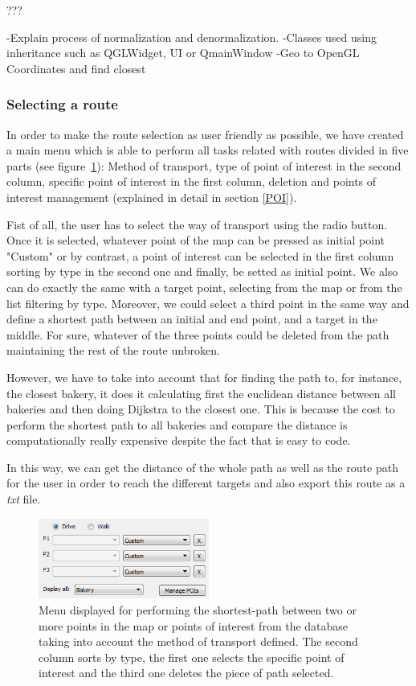 \documentclass{article}
\begin{document}
???



-Explain process of normalization and denormalization.
-Classes used using inheritance such as QGLWidget, UI or QmainWindow
-Geo to OpenGL Coordinates and find closest

\subsubsection{Selecting a route}
In order to make the route selection as user friendly as possible, we have created a main menu which is able to perform all tasks related with routes divided in five parts (see figure~\ref{fig:menu_poi}): Method of transport, type of point of interest in the second column, specific point of interest in the first column, deletion and points of interest management (explained in detail in section \ref{POI}).

Fist of all, the user has to select the way of transport using the radio button. Once it is selected, whatever point of the map can be pressed as initial point "Custom" or by contrast, a point of interest can be selected in the first column sorting by type in the second one and finally, be setted as initial point. We also can do exactly the same with a target point, selecting from the map or from the list filtering by type. Moreover, we could select a third point in the same way and define a shortest path between an initial and end point, and a target in the middle. For sure, whatever of the three points could be deleted from the path maintaining the rest of the route unbroken.

However, we have to take into account that for finding the path to, for instance, the closest bakery, it does it calculating first the euclidean distance between all bakeries and then doing Dijkstra to the closest one. This is because the cost to perform the shortest path to all bakeries and compare the distance is computationally really expensive despite the fact that is easy to code.

In this way, we can get the distance of the whole path as well as the route path for the user in order to reach the different targets and also export this route as a \textit{txt} file.

\begin{figure}[h]
\centering
\includegraphics[width=0.5\textwidth]{menu_points.png}
\caption{Menu displayed for performing the shortest-path between two or more points in the map or points of interest from the database taking into account the method of transport defined. The second column sorts by type, the first one selects the specific point of interest and the third one deletes the piece of path selected.}
\label{fig:menu_poi}
\end{figure}
\end{document}
